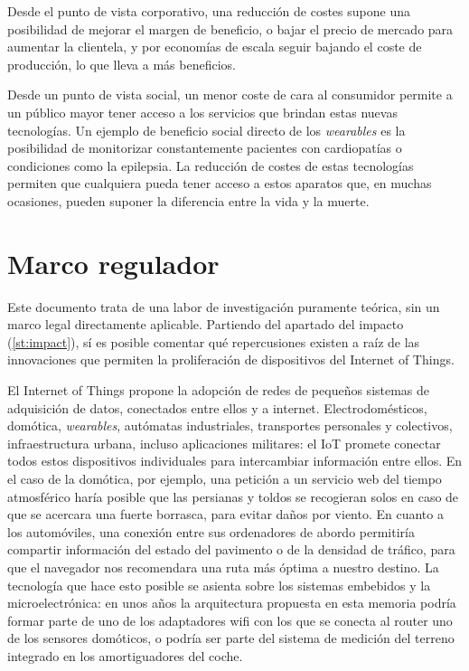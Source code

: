 \documentclass[12pt]{report} %
\begin{document}
	Desde el punto de vista corporativo, una reducción de costes supone una posibilidad de mejorar el margen de beneficio, o bajar el precio de mercado para aumentar la clientela, y por economías de escala seguir bajando el coste de producción, lo que lleva a más beneficios.
	
	Desde un punto de vista social, un menor coste de cara al consumidor permite a un público mayor tener acceso a los servicios que brindan estas nuevas tecnologías. Un ejemplo de beneficio social directo de los \textit{wearables} es la posibilidad de monitorizar constantemente pacientes con cardiopatías o condiciones como la epilepsia. La reducción de costes de estas tecnologías permiten que cualquiera pueda tener acceso a estos aparatos que, en muchas ocasiones, pueden suponer la diferencia entre la vida y la muerte.

	\section{Marco regulador}

	Este documento trata de una labor de investigación puramente teórica, sin un marco legal directamente aplicable. Partiendo del apartado del impacto (\ref{st:impact}), sí es posible comentar qué repercusiones existen a raíz de las innovaciones que permiten la proliferación de dispositivos del Internet of Things.
	
	El Internet of Things propone la adopción de redes de pequeños sistemas de adquisición de datos, conectados entre ellos y a internet. Electrodomésticos, domótica, \textit{wearables}, autómatas industriales, transportes personales y colectivos, infraestructura urbana, incluso aplicaciones militares: el IoT promete conectar todos estos dispositivos individuales para intercambiar información entre ellos. En el caso de la domótica, por ejemplo, una petición a un servicio web del tiempo atmosférico haría posible que las persianas y toldos se recogieran solos en caso de que se acercara una fuerte borrasca, para evitar daños por viento. En cuanto a los automóviles, una conexión entre sus ordenadores de abordo permitiría compartir información del estado del pavimento o de la densidad de tráfico, para que el navegador nos recomendara una ruta más óptima a nuestro destino. La tecnología que hace esto posible se asienta sobre los sistemas embebidos y la microelectrónica: en unos años la arquitectura propuesta en esta memoria podría formar parte de uno de los adaptadores wifi con los que se conecta al router uno de los sensores domóticos, o podría ser parte del sistema de medición del terreno integrado en los amortiguadores del coche.
	
\end{document}
